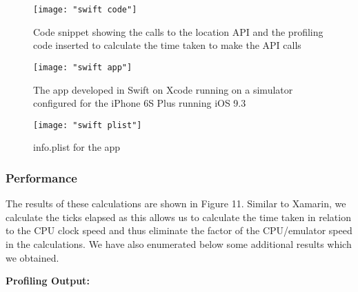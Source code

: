 \documentclass[12pt,a4paper]{article}
\begin{document}
	\begin{figure}
	    \centering
	    \texttt{[image: "swift code"]}
	    \caption{Code snippet showing the calls to the location API and the profiling code inserted to calculate the time taken to make the API calls}
	\end{figure}
	
	\begin{figure}
	    \centering
	    \texttt{[image: "swift app"]}
	    \caption{The app developed in Swift on Xcode running on a simulator configured for the iPhone 6S Plus running iOS 9.3}
	\end{figure}
	
	\begin{figure}
	    \centering
	    \texttt{[image: "swift plist"]}
	    \caption{info.plist for the app}
	\end{figure}

	\subsubsection{Performance}
	
	The results of these calculations are shown in Figure 11. Similar to Xamarin, we calculate the ticks elapsed as this allows us to calculate the time taken in relation to the CPU clock speed and thus eliminate the factor of the CPU/emulator speed in the calculations. We have also enumerated below some additional results which we obtained.
	
	\textbf{Profiling Output:}
	
\end{document}
